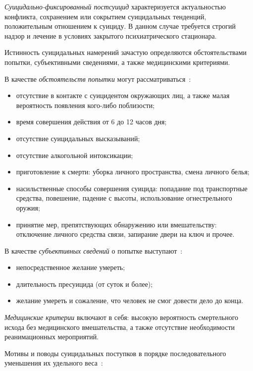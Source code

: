 \textit{Суицидально-фиксированный постсуицид} характеризуется актуальностью конфликта, сохранением или сокрытием суицидальных тенденций, положительным отношением к суициду. 
В данном случае требуется строгий надзор и лечение в условиях закрытого психиатрического стационара.~\cite{starsen}

Истинность суицидальных намерений зачастую определяются обстоятельствами попытки, субъективными сведениями, а также медицинскими критериями.~\cite{starsen}

В качестве \textit{обстоятельств попытки} могут рассматриваться~\cite{starsen}:

\begin{itemize}
	\item отсутствие в контакте с суицидентом окружающих лиц, а также малая вероятность появления кого-либо поблизости;
	\item время совершения действия от 6 до 12 часов дня;
	\item отсутствие суицидальных высказываний;
	\item отсутствие алкогольной интоксикации;
	\item приготовление к смерти: уборка личного пространства, смена личного белья;
	\item насильственные способы совершения суицида: попадание под транспортные средства, повешение, падение с высоты, использование огнестрельного оружия;
	\item принятие мер, препятствующих обнаружению или вмешательству: отключение личного средства связи, запирание двери на ключ и прочее.
\end{itemize}

В качестве \textit{субъективных сведений} о попытке выступают~\cite{starsen}:

\begin{itemize}
	\item непосредственное желание умереть;
	\item длительность пресуицида (от суток и более);
	\item желание умереть и сожаление, что человек не смог довести дело до конца.
\end{itemize}

\textit{Медицинские критерии} включают в себя: высокую вероятность смертельного исхода без медицинского вмешательства, а также отсутствие необходимости реанимационных мероприятий.~\cite{starsen}

Мотивы и поводы суицидальных поступков в порядке последовательного уменьшения их удельного веса~\cite{michlin}:

